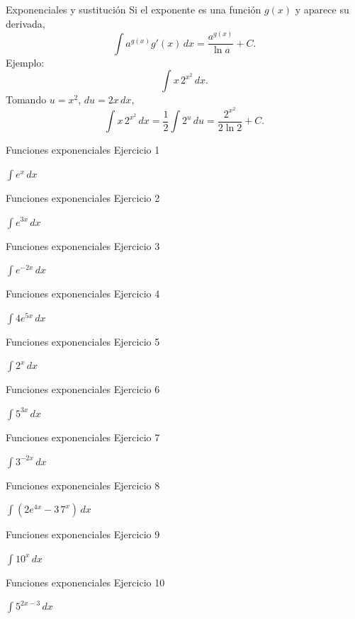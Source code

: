 \documentclass[10pt,aspectratio=169]{beamer}
\newcommand{\ejercicio}[1]{%
  \begin{center}
  \vfill
  {\fontsize{24}{30}\selectfont #1}
  \vfill
  \end{center}
}
\begin{document}
\begin{frame}{Exponenciales y sustitución}
\small
Si el exponente es una función $g(x)$ y aparece su derivada,
\[
\boxed{\int a^{g(x)}g'(x)\,dx
=\frac{a^{g(x)}}{\ln a}+C}.
\]
\pause
Ejemplo:
\[
\int x\,2^{x^2}\,dx.
\]
Tomando $u=x^2$, $du=2x\,dx$,
\[
\int x\,2^{x^2}\,dx
=\frac12\int2^u\,du
=\boxed{\frac{2^{x^2}}{2\ln2}+C}.
\]
\end{frame}

\begin{frame}{Funciones exponenciales}
\small Ejercicio 1
\ejercicio{$\displaystyle \int e^x\,dx$}
\end{frame}

\begin{frame}{Funciones exponenciales}
\small Ejercicio 2
\ejercicio{$\displaystyle \int e^{3x}\,dx$}
\end{frame}

\begin{frame}{Funciones exponenciales}
\small Ejercicio 3
\ejercicio{$\displaystyle \int e^{-2x}\,dx$}
\end{frame}

\begin{frame}{Funciones exponenciales}
\small Ejercicio 4
\ejercicio{$\displaystyle \int 4e^{5x}\,dx$}
\end{frame}

\begin{frame}{Funciones exponenciales}
\small Ejercicio 5
\ejercicio{$\displaystyle \int 2^x\,dx$}
\end{frame}

\begin{frame}{Funciones exponenciales}
\small Ejercicio 6
\ejercicio{$\displaystyle \int 5^{3x}\,dx$}
\end{frame}

\begin{frame}{Funciones exponenciales}
\small Ejercicio 7
\ejercicio{$\displaystyle \int 3^{-2x}\,dx$}
\end{frame}

\begin{frame}{Funciones exponenciales}
\small Ejercicio 8
\ejercicio{$\displaystyle \int(2e^{4x}-3\,7^x)\,dx$}
\end{frame}

\begin{frame}{Funciones exponenciales}
\small Ejercicio 9
\ejercicio{$\displaystyle \int 10^x\,dx$}
\end{frame}

\begin{frame}{Funciones exponenciales}
\small Ejercicio 10
\ejercicio{$\displaystyle \int 5^{2x-3}\,dx$}
\end{frame}
\end{document}
